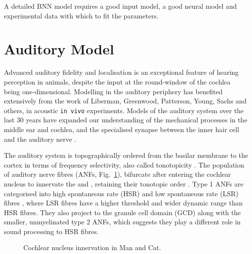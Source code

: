 
A detailed BNN model requires a good input model, a good neural model and experimental
data with which to fit the parameters.  

\section{Auditory Model}

Advanced auditory fidelity and localisation is an exceptional feature of hearing
perception in animals, despite the input at the round-window of the cochlea
being one-dimensional.  Modelling in the auditory periphery has benefited
extensively from the work of Liberman, Greenwood, Patterson, Young, Sachs and
others, in acoustic \texttt{in vivo} experiments. Models of the auditory system
over the last 30 years have expanded our understanding of the mechanical
processes in the middle ear and cochlea, and the specialised synapse between the
inner hair cell and the auditory nerve
\citep{DavisVoigt:1991,Carney:1993,MeddisHewittEtAl:1990}.


The auditory system is topographically ordered from the basilar membrane to the
cortex in terms of frequency selectivity, also called tonotopicity
\citep{YoungOertel:2004}.  The population of auditory nerve fibres (ANFs,
Fig.~\ref{fig:CNdiagram}), bifurcate after entering the cochlear nucleus to
innervate the \VCN and \DCN\@, retaining their tonotopic order
\citep{Lorente:1981, Liberman:1982, Liberman:1993}. Type 1 ANFs are categorised
into high spontaneous rate (HSR) and low spontaneous rate (LSR) fibres
\citep{Liberman:1978}, where LSR fibres have a higher threshold and wider
dynamic range than HSR fibres. They also project to the granule cell domain
(GCD) \citep{RyugoParks:2003, RyugoHaenggeliEtAl:2003} along with the smaller,
unmyelinated type 2 ANFs, which suggests they play a different role in sound
processing to HSR fibres.


\begin{figure}[tbh]
  \begin{center}
    \caption{Cochlear nucleus innervation in Man and Cat. \citep[!find out which publication printed this!]{RyugoParks:2003,Ryugo:1992,Spoendlin:1973}}
    \label{fig:CNdiagram}
  \end{center}
\end{figure}


